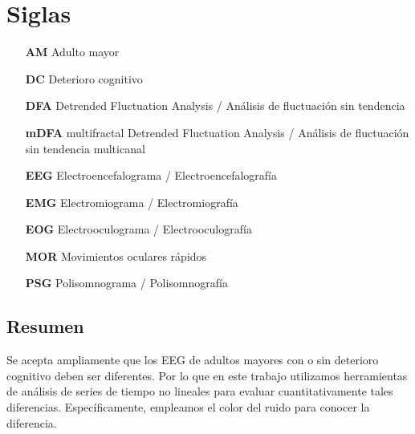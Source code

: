 \documentclass[letterpaper,titlepage,12pt,draft]{report}
\begin{document}

\newpage
\chapter*{Siglas}

\begin{itemize}
\item[{\bf AM}] Adulto mayor
\item[{\bf DC}] Deterioro cognitivo
\item[{\bf DFA}] Detrended Fluctuation Analysis / An\'alisis de fluctuaci\'on sin tendencia
\item[{\bf mDFA}] multifractal Detrended Fluctuation Analysis / An\'alisis de fluctuaci\'on sin tendencia multicanal
\item[{\bf EEG}] Electroencefalograma / Electroencefalograf\'ia 
\item[{\bf EMG}] Electromiograma / Electromiograf\'ia
\item[{\bf EOG}] Electrooculograma / Electrooculograf\'ia
\item[{\bf MOR}] Movimientos oculares r\'apidos
\item[{\bf PSG}] Polisomnograma / Polisomnograf\'ia
\end{itemize}

\newpage
\begin{center}
\chapter*{Resumen}
\end{center}

Se acepta ampliamente que los EEG de adultos mayores con o sin deterioro cognitivo deben ser diferentes. Por lo que en este trabajo utilizamos herramientas de an\'alisis de series de tiempo no lineales para evaluar cuantitativamente tales diferencias. Espec\'ificamente, empleamos el color del ruido para conocer la diferencia.\\
\end{document}
